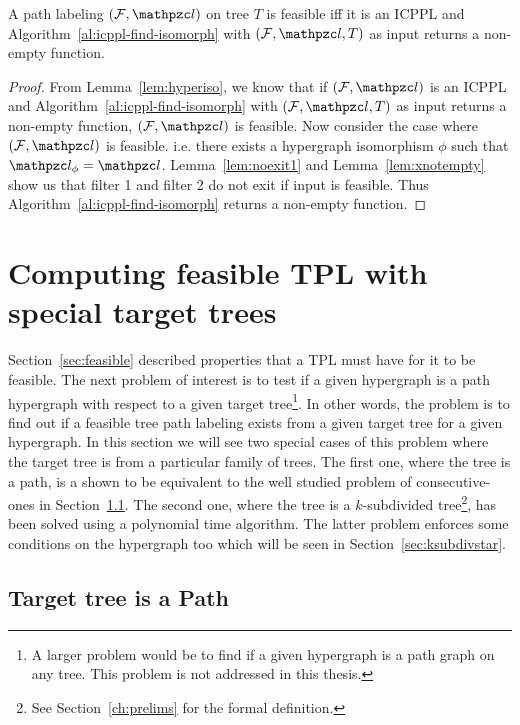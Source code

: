 \begin{theorem}
  \label{th:charac}
  A path labeling $(\cF, \cl)$ on tree $T$ is feasible iff it is an
  ICPPL and Algorithm~\ref{al:icppl-find-isomorph} with $(\cF, \cl,
  T)$ as input returns a non-empty function.
\end{theorem}
\begin{proof}
  From Lemma~\ref{lem:hyperiso}, we know that if $(\cF, \cl)$ is an
  ICPPL and Algorithm~\ref{al:icppl-find-isomorph} with $(\cF, \cl,
  T)$ as input returns a non-empty function, $(\cF, \cl)$ is feasible.
  Now consider the case where $(\cF, \cl)$ is feasible. i.e. there
  exists a hypergraph isomorphism $\phi$ such that $\cl_\phi =
  \cl$. Lemma~\ref{lem:noexit1} and Lemma~\ref{lem:xnotempty} show us
  that filter 1 and filter 2 do not exit if input is feasible. Thus
  Algorithm~\ref{al:icppl-find-isomorph} returns a non-empty
  function.%
\end{proof}


\section{ Computing feasible TPL with special target trees }
\label{sec:spltargettree}

Section~\ref{sec:feasible} described properties that a TPL must have
for it to be feasible. The next problem of interest is to test if a
given hypergraph is a path hypergraph with respect to a given target
tree\footnote{A larger problem would be to find if a given hypergraph
  is a path graph on any tree. This problem is not addressed in this
  thesis.}. In other words, the problem is to find out if a feasible
tree path labeling exists from a given target tree for a given
hypergraph. In this section we will see two special cases of this
problem where the target tree is from a particular family of
trees. The first one, where the tree is a path, is a shown to be
equivalent to the well studied problem of consecutive-ones in
Section~\ref{sec:icpplicpia}. The second one, where the tree is a
$k$-subdivided tree\footnote{See Section~\ref{ch:prelims} for the
  formal definition.}, has been solved using a polynomial time
algorithm. The latter problem enforces some conditions on the
hypergraph too which will be seen in Section~\ref{sec:ksubdivstar}.

\subsection{Target tree is a Path}
\label{sec:icpplicpia}

